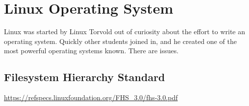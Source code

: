 
\renewcommand{\footerfilename}{Linux.tex}

\section{Linux Operating System}

Linux was started by Linux Torvold out of curiosity about the effort to
write an operating system. Quickly other students joined in, and he
created one of the most powerful operating systems known. There are issues.



\subsection{Filesystem Hierarchy Standard}

\url{https://refspecs.linuxfoundation.org/FHS_3.0/fhs-3.0.pdf}
